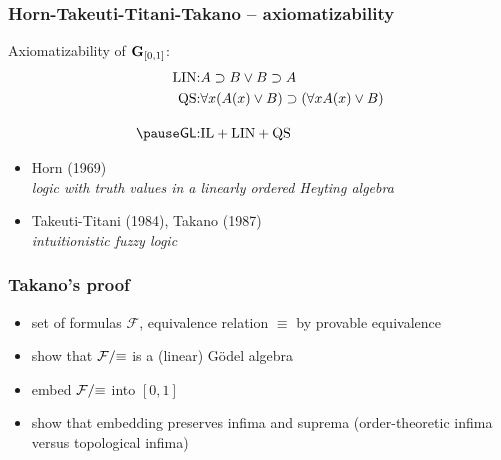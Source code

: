 \documentclass[aspectratio=169]%
  {beamer}
\newcommand{\cF}{\mathcal{F}}
\newcommand\qa[1]{\forall #1}
\newcommand{\limp}{\supset}
\newcommand{\gdl}[1]{{\bf G}_{#1}}
\begin{document}
\begin{frame}
  \frametitle{Horn-Takeuti-Titani-Takano -- axiomatizability}

  Axiomatizability of $\gdl{[0,1]}$:
  \begin{eqnarray*}
    \text{LIN:} & A\limp B \lor B\limp A\\
    \text{QS:}  & \qa x(A(x) \lor B) \limp (\qa xA(x) \lor B)\\[10pt]\pause
    \text{\textsf{GL}:} & \text{IL} +  \text{LIN} + \text{QS}
  \end{eqnarray*}

  \pause
  \begin{itemize}
  \item Horn (1969)\\
    \emph{logic with truth values in a linearly ordered Heyting
      algebra}

    \medskip
  \item Takeuti-Titani (1984), Takano (1987)\\
    \emph{intuitionistic fuzzy logic}
  \end{itemize}
\end{frame}

\begin{frame}
  \frametitle{Takano's proof}
  
  \begin{itemize}
  \item set of formulas $\cF$, equivalence relation $\equiv$ by
    provable equivalence
    
    \medskip
  \item show that $\cF/\mathnormal{\equiv}$ is a (linear) Gödel
    algebra

    \medskip
  \item embed $\cF/\mathnormal{\equiv}$ into $[0,1]$

    \medskip
  \item show that embedding preserves infima and suprema
    (order-theoretic infima versus topological infima)
  \end{itemize}
\end{frame}




  

\end{document}
